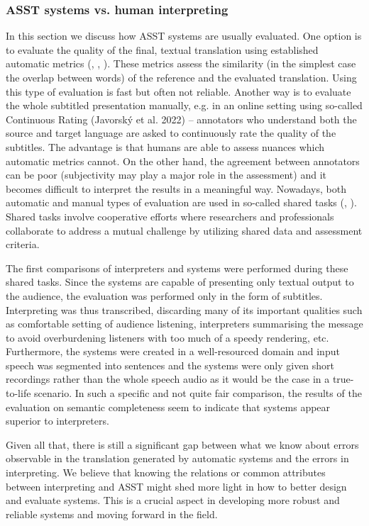 \documentclass[output=paper]{langscibook}
\begin{document}
\subsubsection{ASST systems vs. human interpreting} %

In this section we discuss how ASST systems are usually evaluated. One option is to evaluate the quality of the final, textual translation using established automatic metrics (\citealt{PapineniEtAl2002}, \citealt{Popović2015}, \citealt{Rei2020}). These metrics assess the similarity (in the simplest case the overlap between words) of the reference and the evaluated translation. Using this type of evaluation is fast but often not reliable. Another way is to evaluate the whole subtitled presentation manually, e.g. in an online setting using so-called Continuous Rating (Javorský et al. 2022) – annotators who understand both the source and target language are asked to continuously rate the quality of the subtitles. The advantage is that humans are able to assess nuances which automatic metrics cannot. On the other hand, the agreement between annotators can be poor (subjectivity may play a major role in the assessment) and it becomes difficult to interpret the results in a meaningful way. Nowadays, both automatic and manual types of evaluation are used in so-called shared tasks (\citealt{AgrawalEtAl2023}, \citealt{AnastasopoulosEtAl2022}). Shared tasks involve cooperative efforts where researchers and professionals collaborate to address a mutual challenge by utilizing shared data and assessment criteria.

The first comparisons of interpreters and systems were performed during these shared tasks. Since the systems are capable of presenting only textual output to the audience, the evaluation was performed only in the form of subtitles. Interpreting was thus transcribed, discarding many of its important qualities such as comfortable setting of audience listening, interpreters summarising the message to avoid overburdening listeners with too much of a speedy rendering, etc. Furthermore, the systems were created in a well-resourced domain and input speech was segmented into sentences and the systems were only given short recordings rather than the whole speech audio as it would be the case in a true-to-life scenario. In such a specific and not quite fair comparison, the results of the evaluation on semantic completeness seem to indicate that systems appear superior to interpreters.

Given all that, there is still a significant gap between what we know about errors observable in the translation generated by automatic systems and the errors in interpreting. We believe that knowing the relations or common attributes between interpreting and ASST might shed more light in how to better design and evaluate systems. This is a crucial aspect in developing more robust and reliable systems and moving forward in the field.
\end{document}
